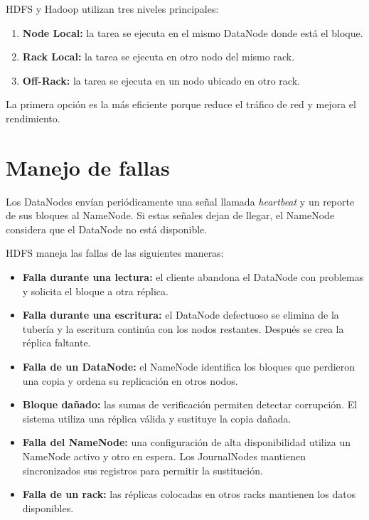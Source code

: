 HDFS y Hadoop utilizan tres niveles principales:

\begin{enumerate}
    \item \textbf{Node Local:} la tarea se ejecuta en el mismo DataNode donde
    está el bloque.

    \item \textbf{Rack Local:} la tarea se ejecuta en otro nodo del mismo rack.

    \item \textbf{Off-Rack:} la tarea se ejecuta en un nodo ubicado en otro
    rack.
\end{enumerate}

La primera opción es la más eficiente porque reduce el tráfico de red y mejora
el rendimiento.

\section{Manejo de fallas}

Los DataNodes envían periódicamente una señal llamada \textit{heartbeat} y un
reporte de sus bloques al NameNode. Si estas señales dejan de llegar, el
NameNode considera que el DataNode no está disponible.

HDFS maneja las fallas de las siguientes maneras:

\begin{itemize}
    \item \textbf{Falla durante una lectura:} el cliente abandona el DataNode
    con problemas y solicita el bloque a otra réplica.

    \item \textbf{Falla durante una escritura:} el DataNode defectuoso se
    elimina de la tubería y la escritura continúa con los nodos restantes.
    Después se crea la réplica faltante.

    \item \textbf{Falla de un DataNode:} el NameNode identifica los bloques
    que perdieron una copia y ordena su replicación en otros nodos.

    \item \textbf{Bloque dañado:} las sumas de verificación permiten detectar
    corrupción. El sistema utiliza una réplica válida y sustituye la copia
    dañada.

    \item \textbf{Falla del NameNode:} una configuración de alta disponibilidad
    utiliza un NameNode activo y otro en espera. Los JournalNodes mantienen
    sincronizados sus registros para permitir la sustitución.

    \item \textbf{Falla de un rack:} las réplicas colocadas en otros racks
    mantienen los datos disponibles.
\end{itemize}

